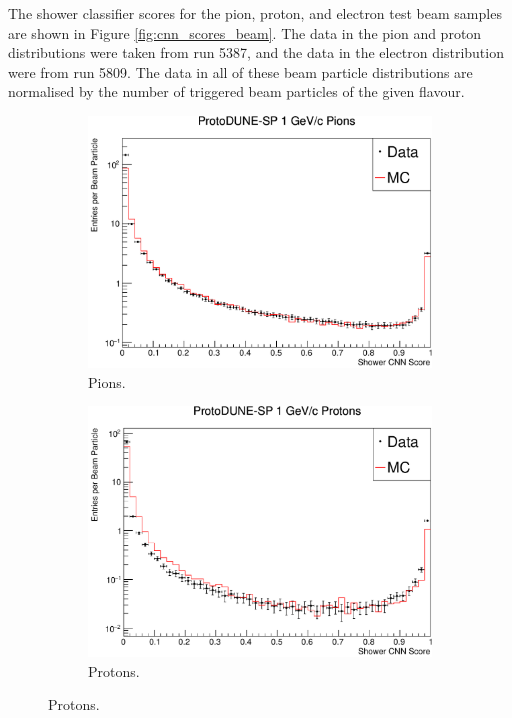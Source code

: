 The shower classifier scores for the pion, proton, and electron test beam 
samples are shown in Figure \ref{fig:cnn_scores_beam}. The data in the pion 
and proton distributions were taken from \protodune{} run 5387, and the data in 
the electron distribution were from run 5809. The data in all of these beam
particle distributions are normalised by the number of triggered 
beam particles of the given flavour.
\begin{figure}

	\centering

	\begin{subfigure}[b]{0.64\textwidth}
		\centering
		\includegraphics[width=\textwidth]{figures/hit_cnn_pion.pdf}
		\caption {Pions.}
		\label{fig:beam_pi_cnn}
	\end{subfigure}

	\begin{subfigure}[b]{0.64\textwidth}
		\centering
		\includegraphics[width=\textwidth]{figures/hit_cnn_proton.pdf}
		\caption {Protons.}
		\label{fig:beam_proton_cnn}
	\end{subfigure}


\end{figure}
